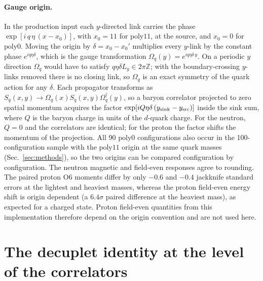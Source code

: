 \documentclass[aps,prd,preprint,nofootinbib,floatfix]{revtex4-2}
\begin{document}
\paragraph{Gauge origin.} In the production input each $y$-directed link carries the phase $\exp[i\,q\,\eta\,(x-x_0)]$, with $x_0=11$ for $\mathrm{poly11}$, at the source, and $x_0=0$ for $\mathrm{poly0}$. Moving the origin by $\delta=x_0-x_0'$ multiplies every $y$-link by the constant phase $e^{iq\eta\delta}$, which is the gauge transformation $\Omega_q(y)=e^{iq\eta\delta\,y}$. On a periodic $y$ direction $\Omega_q$ would have to satisfy $q\eta\delta L_y\in2\pi\mathbb Z$; with the boundary-crossing $y$-links removed there is no closing link, so $\Omega_q$ is an exact symmetry of the quark action for any $\delta$. Each propagator transforms as $S_q(x,y)\to\Omega_q(x)S_q(x,y)\Omega_q^\dagger(y)$, so a baryon correlator projected to zero spatial momentum acquires the factor $\exp[iQ\eta\delta\,(y_{\rm sink}-y_{\rm src})]$ inside the sink sum, where $Q$ is the baryon charge in units of the $d$-quark charge. For the neutron, $Q=0$ and the correlators are identical; for the proton the factor shifts the momentum of the projection. All 90 $\mathrm{poly0}$ configurations also occur in the 100-configuration sample with the $\mathrm{poly11}$ origin at the same quark masses (Sec.~\ref{sec:methods}), so the two origins can be compared configuration by configuration. The neutron magnetic and field-even responses agree to rounding. The paired proton O6 moments differ by only $-0.6$ and $-0.4$ jackknife standard errors at the lightest and heaviest masses, whereas the proton field-even energy shift is origin dependent (a $6.4\sigma$ paired difference at the heaviest mass), as expected for a charged state. Proton field-even quantities from this implementation therefore depend on the origin convention and are not used here.

\section{The decuplet identity at the level of the correlators}
\label{app:identity}
\end{document}

